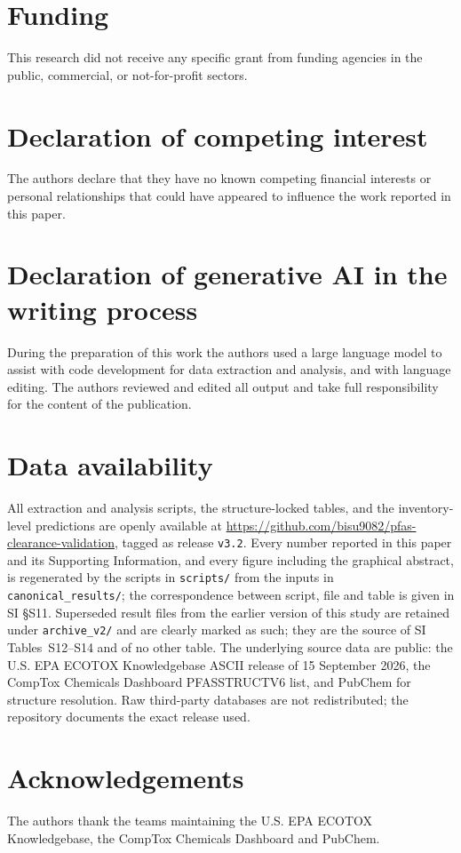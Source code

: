 \documentclass[preprint,12pt]{elsarticle}
\begin{document}
\section*{Funding}
This research did not receive any specific grant from funding agencies in the
public, commercial, or not-for-profit sectors.

\section*{Declaration of competing interest}
The authors declare that they have no known competing financial interests or
personal relationships that could have appeared to influence the work reported
in this paper.

\section*{Declaration of generative AI in the writing process}
During the preparation of this work the authors used a large language model to
assist with code development for data extraction and analysis, and with language
editing. The authors reviewed and edited all output and take full
responsibility for the content of the publication.

\section*{Data availability}
All extraction and analysis scripts, the structure-locked tables, and the
inventory-level predictions are openly available at
\url{https://github.com/bisu9082/pfas-clearance-validation}, tagged as release
\texttt{v3.2}. Every number reported in this paper and its Supporting
Information, and every figure including the graphical abstract, is regenerated
by the scripts in \texttt{scripts/} from the inputs in
\texttt{canonical\_results/}; the correspondence between script, file and
table is given in SI \S S11. Superseded result files from the earlier version of
this study are retained under \texttt{archive\_v2/} and are clearly marked as
such; they are the source of SI Tables~S12--S14 and of no other table. The
underlying source data are public: the U.S. EPA ECOTOX Knowledgebase ASCII
release of 15 September 2026, the CompTox Chemicals Dashboard PFASSTRUCTV6 list,
and PubChem for structure resolution. Raw third-party databases are not
redistributed; the repository documents the exact release used.

\section*{Acknowledgements}
The authors thank the teams maintaining the U.S. EPA ECOTOX Knowledgebase, the
CompTox Chemicals Dashboard and PubChem.



\end{document}
